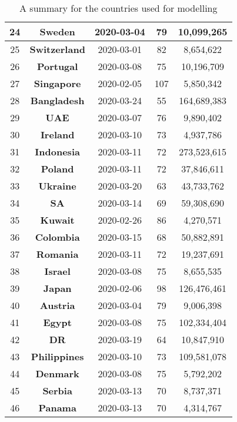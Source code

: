 \begin{table*}
\begin{center}
\begin{tiny}
\begin{tabular}{|c|c|c|c|c|}
24 & {\bf Sweden} & 2020-03-04 & 79 & 10,099,265\\ \hline
25 & {\bf Switzerland} & 2020-03-01 & 82 & 8,654,622\\ \hline
26 & {\bf Portugal} & 2020-03-08 & 75 & 10,196,709\\ \hline
27 & {\bf Singapore} & 2020-02-05 & 107 & 5,850,342\\ \hline
28 & {\bf Bangladesh} & 2020-03-24 & 55 & 164,689,383\\ \hline
29 & {\bf UAE} & 2020-03-07 & 76 & 9,890,402\\ \hline
30 & {\bf Ireland} & 2020-03-10 & 73 & 4,937,786\\ \hline
31 & {\bf Indonesia} & 2020-03-11 & 72 & 273,523,615\\ \hline
32 & {\bf Poland} & 2020-03-11 & 72 & 37,846,611\\ \hline
33 & {\bf Ukraine} & 2020-03-20 & 63 & 43,733,762\\ \hline
34 & {\bf SA} & 2020-03-14 & 69 & 59,308,690\\ \hline
35 & {\bf Kuwait} & 2020-02-26 & 86 & 4,270,571\\ \hline
36 & {\bf Colombia} & 2020-03-15 & 68 & 50,882,891\\ \hline
37 & {\bf Romania} & 2020-03-11 & 72 & 19,237,691\\ \hline
38 & {\bf Israel} & 2020-03-08 & 75 & 8,655,535\\ \hline
39 & {\bf Japan} & 2020-02-06 & 98 & 126,476,461\\ \hline
40 & {\bf Austria} & 2020-03-04 & 79 & 9,006,398\\ \hline
41 & {\bf Egypt} & 2020-03-08 & 75 & 102,334,404\\ \hline
42 & {\bf DR} & 2020-03-19 & 64 & 10,847,910\\ \hline
43 & {\bf Philippines} & 2020-03-10 & 73 & 109,581,078\\ \hline
44 & {\bf Denmark} & 2020-03-08 & 75 & 5,792,202\\ \hline
45 & {\bf Serbia} & 2020-03-13 & 70 & 8,737,371\\ \hline
46 & {\bf Panama} & 2020-03-13 & 70 & 4,314,767\\ \hline
\end{tabular}
\caption{A summary for the countries used for modelling}
\label{countries}
\end{tiny}
\end{center}
\end{table*}
